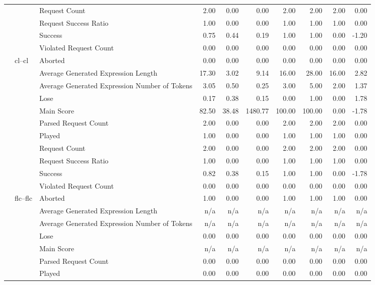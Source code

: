 \begin{tabular}{lllrrrrrrr}
 &  & Request Count & 2.00 & 0.00 & 0.00 & 2.00 & 2.00 & 2.00 & 0.00 \\
 &  & Request Success Ratio & 1.00 & 0.00 & 0.00 & 1.00 & 1.00 & 1.00 & 0.00 \\
 &  & Success & 0.75 & 0.44 & 0.19 & 1.00 & 1.00 & 0.00 & -1.20 \\
 &  & Violated Request Count & 0.00 & 0.00 & 0.00 & 0.00 & 0.00 & 0.00 & 0.00 \\
\cline{2-10}
 & \multirow[t]{11}{*}{cl--cl} & Aborted & 0.00 & 0.00 & 0.00 & 0.00 & 0.00 & 0.00 & 0.00 \\
 &  & Average Generated Expression Length & 17.30 & 3.02 & 9.14 & 16.00 & 28.00 & 16.00 & 2.82 \\
 &  & Average Generated Expression Number of Tokens & 3.05 & 0.50 & 0.25 & 3.00 & 5.00 & 2.00 & 1.37 \\
 &  & Lose & 0.17 & 0.38 & 0.15 & 0.00 & 1.00 & 0.00 & 1.78 \\
 &  & Main Score & 82.50 & 38.48 & 1480.77 & 100.00 & 100.00 & 0.00 & -1.78 \\
 &  & Parsed Request Count & 2.00 & 0.00 & 0.00 & 2.00 & 2.00 & 2.00 & 0.00 \\
 &  & Played & 1.00 & 0.00 & 0.00 & 1.00 & 1.00 & 1.00 & 0.00 \\
 &  & Request Count & 2.00 & 0.00 & 0.00 & 2.00 & 2.00 & 2.00 & 0.00 \\
 &  & Request Success Ratio & 1.00 & 0.00 & 0.00 & 1.00 & 1.00 & 1.00 & 0.00 \\
 &  & Success & 0.82 & 0.38 & 0.15 & 1.00 & 1.00 & 0.00 & -1.78 \\
 &  & Violated Request Count & 0.00 & 0.00 & 0.00 & 0.00 & 0.00 & 0.00 & 0.00 \\
\cline{2-10}
 & \multirow[t]{11}{*}{flc--flc} & Aborted & 1.00 & 0.00 & 0.00 & 1.00 & 1.00 & 1.00 & 0.00 \\
 &  & Average Generated Expression Length & n/a & n/a & n/a & n/a & n/a & n/a & n/a \\
 &  & Average Generated Expression Number of Tokens & n/a & n/a & n/a & n/a & n/a & n/a & n/a \\
 &  & Lose & 0.00 & 0.00 & 0.00 & 0.00 & 0.00 & 0.00 & 0.00 \\
 &  & Main Score & n/a & n/a & n/a & n/a & n/a & n/a & n/a \\
 &  & Parsed Request Count & 0.00 & 0.00 & 0.00 & 0.00 & 0.00 & 0.00 & 0.00 \\
 &  & Played & 0.00 & 0.00 & 0.00 & 0.00 & 0.00 & 0.00 & 0.00 \\

\end{tabular}
